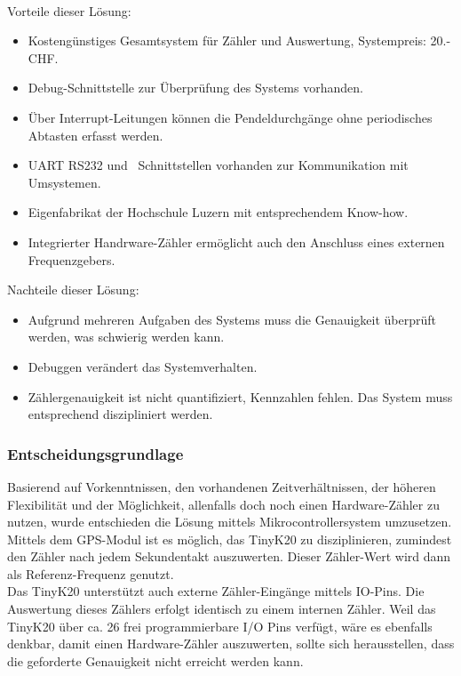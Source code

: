         \\
    	Vorteile dieser Lösung:
    	\begin{itemize}
    		\item Kostengünstiges Gesamtsystem für Zähler und Auswertung, Systempreis: 20.- CHF.
    		\item Debug-Schnittstelle zur Überprüfung des Systems vorhanden.
    		\item Über Interrupt-Leitungen können die Pendeldurchgänge ohne periodisches Abtasten erfasst werden.
    		\item UART RS232 und \iic\ Schnittstellen vorhanden zur Kommunikation mit Umsystemen.
    		\item Eigenfabrikat der Hochschule Luzern mit entsprechendem Know-how.
    		\item Integrierter Handrware-Zähler ermöglicht auch den Anschluss eines externen Frequenzgebers.
    	\end{itemize}
    	Nachteile dieser Lösung:
    	\begin{itemize}
    		\item Aufgrund mehreren Aufgaben des Systems muss die Genauigkeit überprüft werden, was schwierig werden kann.
    		\item Debuggen verändert das Systemverhalten.
    		\item Zählergenauigkeit ist nicht quantifiziert, Kennzahlen fehlen. Das System muss entsprechend diszipliniert werden.
    	\end{itemize}
    \subsubsection{Entscheidungsgrundlage}
		Basierend auf Vorkenntnissen, den vorhandenen Zeitverhältnissen, der höheren Flexibilität und der Möglichkeit, allenfalls doch noch einen Hardware-Zähler zu nutzen, wurde entschieden die Lösung mittels Mikrocontrollersystem umzusetzen. Mittels dem GPS-Modul ist es möglich, das TinyK20 zu disziplinieren, zumindest den Zähler nach jedem Sekundentakt auszuwerten. Dieser Zähler-Wert wird dann als Referenz-Frequenz genutzt.\\
		Das TinyK20 unterstützt auch externe Zähler-Eingänge mittels IO-Pins. Die Auswertung dieses Zählers erfolgt identisch zu einem internen Zähler. 
		Weil das TinyK20 über ca. 26 frei programmierbare I/O Pins verfügt, wäre es ebenfalls denkbar, damit einen Hardware-Zähler auszuwerten, sollte sich herausstellen, dass die geforderte Genauigkeit nicht erreicht werden kann.
%
%
\clearpage
